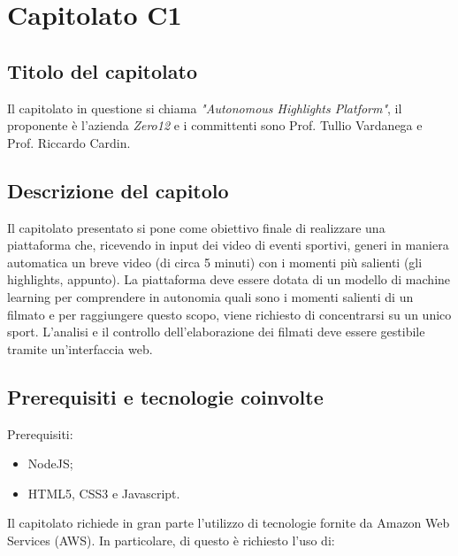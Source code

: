 \section{Capitolato C1}
\subsection{Titolo del capitolato}
Il capitolato in questione si chiama \textit{"Autonomous Highlights Platform"}, il proponente \`e l'azienda \textit{Zero12} e i committenti sono Prof. Tullio Vardanega e Prof. Riccardo Cardin.

\subsection{Descrizione del capitolo}
Il capitolato presentato si pone come obiettivo finale di realizzare una piattaforma che, ricevendo in input dei video di eventi sportivi, generi in maniera automatica un breve video (di circa 5 minuti) con i momenti più salienti (gli highlights, appunto).
La piattaforma deve essere dotata di un modello di machine learning per comprendere in autonomia quali sono i momenti salienti di un filmato e per raggiungere questo scopo, viene richiesto di concentrarsi su un unico sport.
L'analisi e il controllo dell'elaborazione dei filmati deve essere gestibile tramite un'interfaccia web.

\subsection{Prerequisiti e tecnologie coinvolte}
Prerequisiti:
\begin{itemize}
\item NodeJS;
\item HTML5, CSS3 e Javascript.
\end{itemize}
Il capitolato richiede in gran parte l'utilizzo di tecnologie fornite da Amazon Web Services (AWS).
In particolare, di questo \`e richiesto l'uso di:

